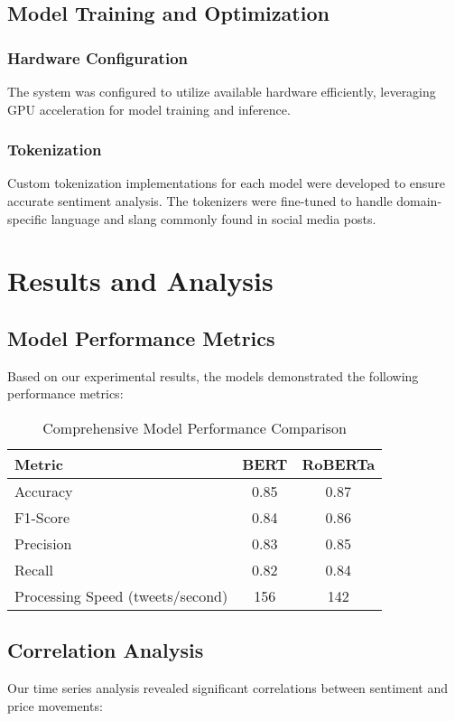 \documentclass[12pt,a4paper]{report}
\begin{document}
\section{Model Training and Optimization}
\subsection{Hardware Configuration}
The system was configured to utilize available hardware efficiently, leveraging
GPU acceleration for model training and inference.

\subsection{Tokenization}
Custom tokenization implementations for each model were developed to ensure
accurate sentiment analysis. The tokenizers were fine-tuned to handle
domain-specific language and slang commonly found in social media posts.

\chapter{Results and Analysis}
\section{Model Performance Metrics}
Based on our experimental results, the models demonstrated the following
performance metrics:

\begin{table}[h]
    \centering
    \begin{tabular}{lcc}
        \toprule
        Metric                           & BERT & RoBERTa \\
        \midrule
        Accuracy                         & 0.85 & 0.87    \\
        F1-Score                         & 0.84 & 0.86    \\
        Precision                        & 0.83 & 0.85    \\
        Recall                           & 0.82 & 0.84    \\
        Processing Speed (tweets/second) & 156  & 142     \\
        \bottomrule
    \end{tabular}
    \caption{Comprehensive Model Performance Comparison}
\end{table}

\section{Correlation Analysis}
Our time series analysis revealed significant correlations between sentiment
and price movements:
\end{document}
